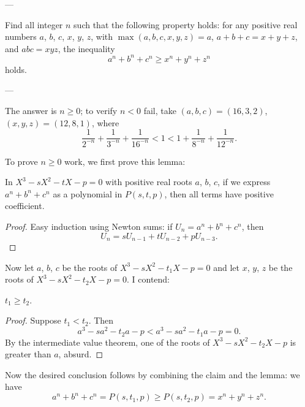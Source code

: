 
---

Find all integer $n$ such that the following property holds: for any positive real numbers $a$, $b$, $c$, 
$x$, $y$, $z$, with $\max(a,b,c,x,y,z)=a$, $a+b+c=x+y+z$, and $abc=xyz$, the inequality
\[a^n+b^n+c^n \ge x^n+y^n+z^n\]
holds.

---

The answer is $n\ge0$; to verify $n<0$ fail, take $(a,b,c)=(16,3,2)$, $(x,y,z)=(12,8,1)$, where
\[\frac1{2^{-n}}+\frac1{3^{-n}}+\frac1{16^{-n}}<1<1+\frac1{8^{-n}}+\frac1{12^{-n}}.\]

To prove $n\ge0$ work, we first prove this lemma:
\begin{lemma*}
    In $X^3-sX^2-tX-p=0$ with positive real roots $a$, $b$, $c$, if we express
    $a^n+b^n+c^n$ as a polynomial in $P(s,t,p)$, then all terms have positive coefficient.
\end{lemma*}
\begin{proof}
    Easy induction using Newton sums: if $U_n=a^n+b^n+c^n$, then
    \[U_n=sU_{n-1}+tU_{n-2}+pU_{n-3}.\]
\end{proof}

Now let $a$, $b$, $c$ be the roots of $X^3-sX^2-t_1X-p=0$ and let $x$, $y$, $z$ be the roots of $X^3-sX^2-t_2X-p=0$. I contend:
\begin{claim*}
    $t_1\ge t_2$.
\end{claim*}
\begin{proof}
    Suppose $t_1<t_2$. Then
    \[a^3-sa^2-t_2a-p<a^3-sa^2-t_1a-p=0.\]
    By the intermediate value theorem, one of the roots of
    $X^3-sX^2-t_2X-p$ is greater than $a$, absurd.
\end{proof}

Now the desired conclusion follows by combining the claim and the lemma: we have
\[a^n+b^n+c^n=P(s,t_1,p)\ge P(s,t_2,p)=x^n+y^n+z^n.\]
